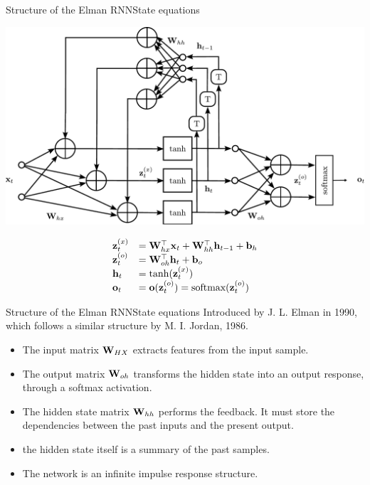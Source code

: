 \documentclass{beamer}
\begin{document}
\begin{frame}{Structure of the Elman RNN}{State equations}
\begin{center}
    \includegraphics[scale = 0.25]{Module 5 (RNN)/pics/rnn_rolled.pdf}
    \end{center}

\begin{equation}\label{eq:RNN_recursion} 
\begin{array}{ll}
{\bf z}^{(x)}_{t}&={\bf W}_{hx}^\top{\bf x}_{t} + {\bf W}_{hh}^\top{\bf h}_{t-1}+{\bf b}_{h} \\
{\bf z}^{(o)}_{t}&={\bf W}_{oh}^\top{\bf h}_{t} +{\bf b}_{o}\\
{\bf h}_{t}&=\tanh({\bf z}^{(x)}_{t})\\
{{\bf o}_{t}}&={\bf o}({\bf z}^{(o)}_t)=\text{softmax}({\bf z}^{(o)}_{t})
\end{array}
\end{equation}
\end{frame}

\begin{frame}{Structure of the Elman RNN}{State equations}
Introduced by J. L. Elman in 1990, which follows a similar structure
 by M. I. Jordan, 1986. 
 \vspace{0.5cm}
    \begin{itemize}
    \item The input matrix ${\bf W}_{HX}$ extracts features from the input sample. 
    \item The output matrix ${\bf W}_{oh}$ transforms the hidden state into an output response, through a softmax activation. 
    \item The hidden state matrix ${\bf W}_{hh}$ performs the feedback. It must store the dependencies between the past inputs and the present output.  
    \item the hidden state itself is a summary of the past samples. 
    \item The network is an infinite impulse response structure. 
    \end{itemize}
\end{frame}
\end{document}
